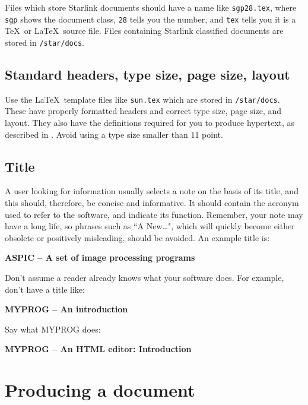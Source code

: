 Files which store Starlink documents should have a name like {\tt sgp28.tex},
where {\tt sgp} shows the document class, {\tt 28} tells you the number, and
{\tt tex} tells you it is a \TeX\ or \LaTeX\ source file.
Files containing Starlink classified documents are stored in {\tt /star/docs}.

\subsection{Standard headers, type size, page size, layout}

Use the \LaTeX\ template files like {\tt sun.tex} which are stored in
{\tt /star/docs}.
These have properly formatted headers and correct type size, page size, and
layout.
They also have the definitions required for you to produce hypertext, as
described in .
Avoid using a type size smaller than 11 point.

\subsection{Title}

A user looking for information usually selects a note on the basis of its title,
and this should, therefore, be concise and informative.
It should contain the acronym used to refer to the software, and indicate its
function.
Remember, your note may have a long life, so phrases such as ``A New\ldots",
which will quickly become either obsolete or positively misleading, should be
avoided.
An example title is:

\begin{center}
{\bf ASPIC -- A set of image processing programs}
\end{center}

Don't assume a reader already knows what your software does.
For example, don't have a title like:

\begin{center}
{\bf MYPROG -- An introduction}
\end{center}

Say what MYPROG does:

\begin{center}
{\bf MYPROG -- An HTML editor: Introduction}
\end{center}

\newpage

\section{Producing a document}

